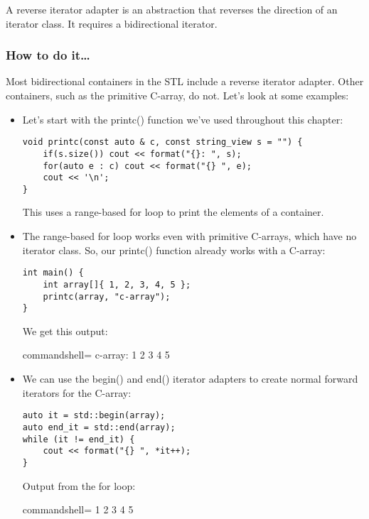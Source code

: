 
A reverse iterator adapter is an abstraction that reverses the direction of an iterator class. It requires a bidirectional iterator.

\subsubsection{How to do it…}

Most bidirectional containers in the STL include a reverse iterator adapter. Other containers, such as the primitive C-array, do not. Let's look at some examples:

\begin{itemize}
\item 
Let's start with the printc() function we've used throughout this chapter:

\begin{lstlisting}[style=styleCXX]
void printc(const auto & c, const string_view s = "") {
	if(s.size()) cout << format("{}: ", s);
	for(auto e : c) cout << format("{} ", e);
	cout << '\n';
}
\end{lstlisting}

This uses a range-based for loop to print the elements of a container.

\item 
The range-based for loop works even with primitive C-arrays, which have no iterator class. So, our printc() function already works with a C-array:

\begin{lstlisting}[style=styleCXX]
int main() {
	int array[]{ 1, 2, 3, 4, 5 };
	printc(array, "c-array");
}
\end{lstlisting}

We get this output:

\begin{tcblisting}{commandshell={}}
c-array: 1 2 3 4 5
\end{tcblisting}

\item 
We can use the begin() and end() iterator adapters to create normal forward iterators for the C-array:

\begin{lstlisting}[style=styleCXX]
auto it = std::begin(array);
auto end_it = std::end(array);
while (it != end_it) {
	cout << format("{} ", *it++);
}
\end{lstlisting}

Output from the for loop:

\begin{tcblisting}{commandshell={}}
1 2 3 4 5
\end{tcblisting}


\end{itemize}
